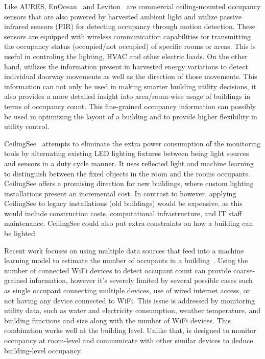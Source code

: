Like AURES, EnOcean~\cite{EnOcean} and Leviton~\cite{Leviton} are commercial ceiling-mounted occupancy sensors that are also powered by harvested ambient light and utilize passive infrared sensors (PIR) for detecting occupancy through motion detection. These sensors are equipped with wireless communication capabilities for transmitting the occupancy status (occupied/not occupied) of specific rooms or areas. This is useful in controling the lighting, HVAC and other electric loads. On the other hand, \sysname utilizes the information present in harvested energy variations to detect individual doorway movements as well as the direction of those movements. This information can not only be used in making smarter building utility decisions, it also provides a more detailed insight into area/room-wise usage of buildings in terms of occupancy count. This fine-grained occupancy information can possibly be used in optimizing the layout of a building and to provide higher flexibility in utility control.

CeilingSee~\cite{yang2017ceilingsee} attempts to eliminate the extra power consumption of the monitoring tools by alternating existing LED lighting fixtures between being light sources and sensors in a duty cycle manner.
It uses reflected light and machine learning to distinguish between the fixed objects in the room and the rooms occupants.
CeilingSee offers a promising direction for new buildings, where custom lighting installations present an incremental cost. 
In contrast to \sysname however, applying CeilingSee to legacy installations (old buildings) would be expensive, as this would include construction costs, computational infrastructure, and IT staff maintenance.
CeilingSee could also put extra constraints on how a building can be lighted.

Recent work focuses on using multiple data sources that feed into a machine learning model to estimate the number of occupants in a building~\cite{das2017non}. Using the number of connected WiFi devices to detect occupant count can provide coarse-grained information, however it's severely limited by several possible cases such as single occupant connecting multiple devices, use of wired internet access, or not having any device connected to WiFi. This issue is addressed by monitoring utility data, such as water and electricity consumption, weather temperature, and building functions and size along with the number of WiFi devices. This combination works well at the building level. Unlike that, \sysname is designed to monitor occupancy at room-level and communicate with other similar devices to deduce building-level occupancy.


